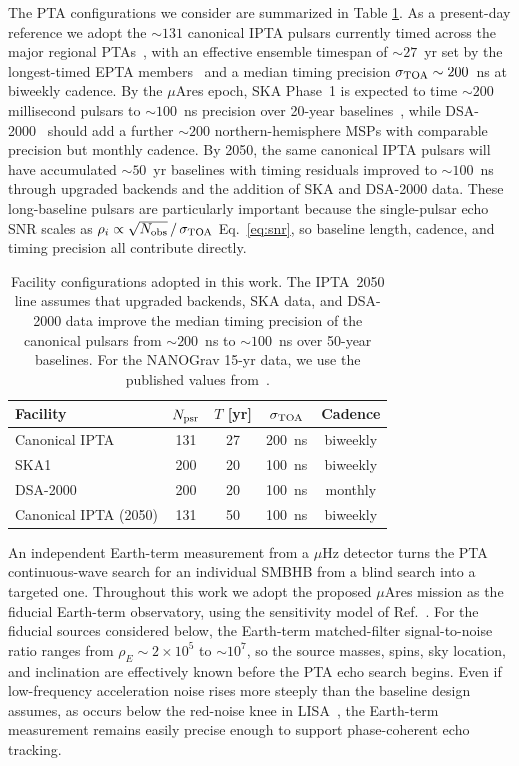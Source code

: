 \documentclass[aps,prx,twocolumn,superscriptaddress,nofootinbib,longbibliography]{revtex4-2}
\begin{document}
The PTA configurations we consider are summarized in Table \ref{tab:facilities}. As a present-day reference we adopt the $\sim131$ canonical IPTA pulsars currently timed across the major regional PTAs~\cite{Mingarelli2026review}, with an effective ensemble timespan of $\sim27$~yr set by the longest-timed EPTA members~\cite{Desvignes2016} and a median timing precision $\sigma_{\rm TOA}\sim200$~ns at biweekly cadence. By the $\mu$Ares epoch, SKA Phase~1 is expected to time $\sim200$ millisecond pulsars to $\sim100$~ns precision over 20-year baselines~\cite{SKAPTA2025,Keane2025}, while DSA-2000~\cite{DSA2000} should add a further $\sim200$ northern-hemisphere MSPs with comparable precision but monthly cadence. By 2050, the same canonical IPTA pulsars will have accumulated $\sim50$~yr baselines with timing residuals improved to $\sim100$~ns through upgraded backends and the addition of SKA and DSA-2000 data. These long-baseline pulsars are particularly important because the single-pulsar echo SNR scales as $\rho_i \propto \sqrt{N_{\rm obs}}\,/\,\sigma_{\rm TOA}$ Eq.~\eqref{eq:snr}, so baseline length, cadence, and timing precision all contribute directly.

\begin{table}[t]
\caption{Facility configurations adopted in this work. The IPTA~2050 line assumes that upgraded backends, SKA data, and DSA-2000 data improve the median timing precision of the canonical pulsars from $\sim200$~ns to $\sim100$~ns over 50-year baselines. For the NANOGrav 15-yr data, we use the published values from~\cite{NG15-timing}. }\label{tab:facilities}
\centering
\begin{tabular}{lcccc}
\hline\hline
Facility & $N_{\rm psr}$ & $T$ [yr] & $\sigma_{\rm TOA}$ & Cadence \\
\hline
Canonical IPTA & 131 & 27 & 200~ns & biweekly \\
SKA1 & 200 & 20 & 100~ns & biweekly \\
DSA-2000 & 200 & 20 & 100~ns & monthly \\
Canonical IPTA (2050) & 131 & 50 & 100~ns & biweekly \\
\hline\hline
\end{tabular}
\end{table}

An independent Earth-term measurement from a $\mu$Hz detector turns the PTA continuous-wave search for an individual SMBHB from a blind search into a targeted one. Throughout this work we adopt the proposed $\mu$Ares mission as the fiducial Earth-term observatory, using the sensitivity model of Ref.~\cite{Sesana2021}. For the fiducial sources considered below, the Earth-term matched-filter signal-to-noise ratio ranges from $\rho_E\sim2\times10^5$ to $\sim10^7$, so the source masses, spins, sky location, and inclination are effectively known before the PTA echo search begins. Even if low-frequency acceleration noise rises more steeply than the baseline design assumes, as occurs below the red-noise knee in LISA~\cite{LISA2017}, the Earth-term measurement remains easily precise enough to support phase-coherent echo tracking.
\end{document}
